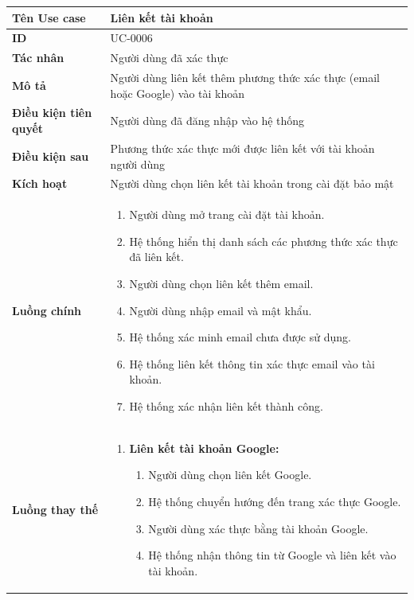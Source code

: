 {
\renewcommand{\arraystretch}{1.5}

\begin{tabularx}{\textwidth}{|>{\raggedright\arraybackslash}X|>{\raggedright\arraybackslash}X|}
\hline
\textbf{Tên Use case} & Liên kết tài khoản \\
\hline
\textbf{ID} & UC-0006 \\
\hline
\textbf{Tác nhân} & Người dùng đã xác thực \\
\hline
\textbf{Mô tả} & Người dùng liên kết thêm phương thức xác thực (email hoặc Google) vào tài khoản \\
\hline
\textbf{Điều kiện tiên quyết} & Người dùng đã đăng nhập vào hệ thống \\
\hline
\textbf{Điều kiện sau} & Phương thức xác thực mới được liên kết với tài khoản người dùng \\
\hline
\textbf{Kích hoạt} & Người dùng chọn liên kết tài khoản trong cài đặt bảo mật \\
\hline
\textbf{Luồng chính} &
\begin{enumerate}
    \item Người dùng mở trang cài đặt tài khoản.
    \item Hệ thống hiển thị danh sách các phương thức xác thực đã liên kết.
    \item Người dùng chọn liên kết thêm email.
    \item Người dùng nhập email và mật khẩu.
    \item Hệ thống xác minh email chưa được sử dụng.
    \item Hệ thống liên kết thông tin xác thực email vào tài khoản.
    \item Hệ thống xác nhận liên kết thành công.
\end{enumerate} \\
\hline
\textbf{Luồng thay thế} &
\begin{enumerate}
    \item \textbf{Liên kết tài khoản Google:}
    \begin{enumerate}
        \item[3A.] Người dùng chọn liên kết Google.
        \item[4A.] Hệ thống chuyển hướng đến trang xác thực Google.
        \item[5A.] Người dùng xác thực bằng tài khoản Google.
        \item[6A.] Hệ thống nhận thông tin từ Google và liên kết vào tài khoản.
    \end{enumerate}

\end{enumerate}
\end{tabularx}}
